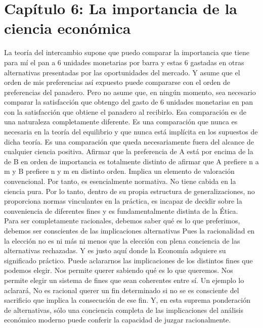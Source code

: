  \section{Capítulo 6: La importancia de la ciencia económica}
 La teoría del intercambio supone que puedo comparar la importancia que tiene para mí el pan a 6 unidades monetarias por barra y estas 6 gastadas en otras alternativas presentadas por las oportunidades del mercado. Y asume que el orden de mis preferencias así expuesto puede compararse con el orden de preferencias del panadero. Pero no asume que, en ningún momento, sea necesario comparar la satisfacción que obtengo del gasto de 6 unidades monetarias en pan con la satisfacción que obtiene el panadero al recibirlo. Esa comparación es de una naturaleza completamente diferente. Es una comparación que nunca es necesaria en la teoría del equilibrio y que nunca está implícita en los supuestos de dicha teoría. Es una comparación que queda necesariamente fuera del alcance de cualquier ciencia positiva. Afirmar que la preferencia de A está por encima de la de B en orden de importancia es totalmente distinto de afirmar que A prefiere n a m y B prefiere n y m en distinto orden. Implica un elemento de valoración convencional. Por tanto, es esencialmente normativa. No tiene cabida en la ciencia pura. Por lo tanto, dentro de su propia estructura de generalizaciones, no proporciona normas vinculantes en la práctica, es incapaz de decidir sobre la conveniencia de diferentes fines y es fundamentalmente distinta de la Ética. \\

 Para ser completamente racionales, debemos saber qué es lo que preferimos, debemos ser conscientes de las implicaciones alternativas Pues la racionalidad en la elección no es ni más ni menos que la elección con plena conciencia de las alternativas rechazadas. Y es justo aquí donde la Economía adquiere su significado práctico. Puede aclararnos las implicaciones de los distintos fines que podemos elegir. Nos permite querer sabiendo qué es lo que queremos. Nos permite elegir un sistema de fines que sean coherentes entre sí. Un ejemplo lo aclarará, No es racional querer un fin determinado si no se es consciente del sacrificio que implica la consecución de ese fin. Y, en esta suprema ponderación de alternativas, sólo una conciencia completa de las implicaciones del análisis económico moderno puede conferir la capacidad de juzgar racionalmente.

